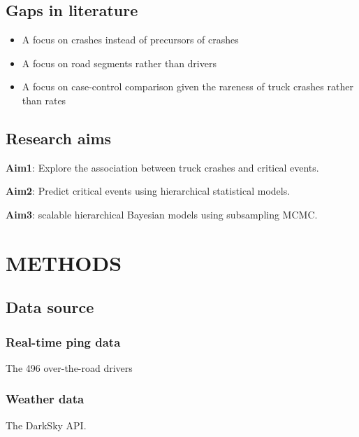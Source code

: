 \documentclass[12pt]{book}
\numberwithin{equation}{chapter}
\providecommand{\tightlist}{%
  \setlength{\itemsep}{0pt}\setlength{\parskip}{0pt}}
\begin{document}
\hypertarget{gaps-in-literature}{%
\section{Gaps in literature}\label{gaps-in-literature}}

\begin{itemize}
\tightlist
\item
  A focus on crashes instead of precursors of crashes
\item
  A focus on road segments rather than drivers
\item
  A focus on case-control comparison given the rareness of truck crashes rather than rates
\end{itemize}

\hypertarget{research-aims}{%
\section{Research aims}\label{research-aims}}

\textbf{Aim1}: Explore the association between truck crashes and critical events.

\textbf{Aim2}: Predict critical events using hierarchical statistical models.

\textbf{Aim3}: scalable hierarchical Bayesian models using subsampling MCMC.

\hypertarget{methods}{%
\chapter{METHODS}\label{methods}}

\hypertarget{data-source}{%
\section{Data source}\label{data-source}}

\hypertarget{real-time-ping-data}{%
\subsection{Real-time ping data}\label{real-time-ping-data}}

The 496 over-the-road drivers

\hypertarget{weather-data}{%
\subsection{Weather data}\label{weather-data}}

The DarkSky API.
\end{document}
